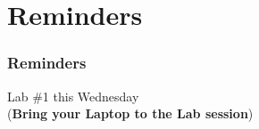 \documentclass[11pt]{beamer}
\begin{document}

\section{Reminders}

\begin{frame}[plain,c]
  \frametitle{Reminders}
  \Enlarge

  \begin{center}
    {\Huge Lab \#1 this Wednesday}\\ \vspace{2mm}
    \textcolor{\CSBase}{({\bf Bring your Laptop to the Lab session})}
  \end{center}
\end{frame}
\end{document}
